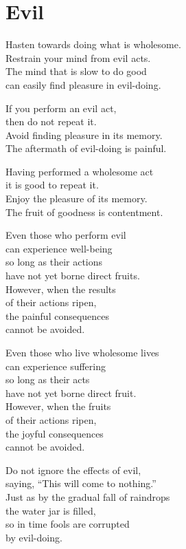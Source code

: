 
\chapter{Evil}


Hasten towards doing what is wholesome.\\
Restrain your mind from evil acts.\\
The mind that is slow to do good\\
can easily find pleasure in evil-doing.


If you perform an evil act,\\
then do not repeat it.\\
Avoid finding pleasure in its memory.\\
The aftermath of evil-doing is painful.


Having performed a wholesome act\\
it is good to repeat it.\\
Enjoy the pleasure of its memory.\\
The fruit of goodness is contentment.


Even those who perform evil\\
can experience well-being\\
so long as their actions\\
have not yet borne direct fruits.\\
However, when the results\\
of their actions ripen,\\
the painful consequences\\
cannot be avoided.


Even those who live wholesome lives\\
can experience suffering\\
so long as their acts\\
have not yet borne direct fruit.\\
However, when the fruits\\
of their actions ripen,\\
the joyful consequences\\
cannot be avoided.


Do not ignore the effects of evil,\\
saying, “This will come to nothing.”\\
Just as by the gradual fall of raindrops\\
the water jar is filled,\\
so in time fools are corrupted\\
by evil-doing.

